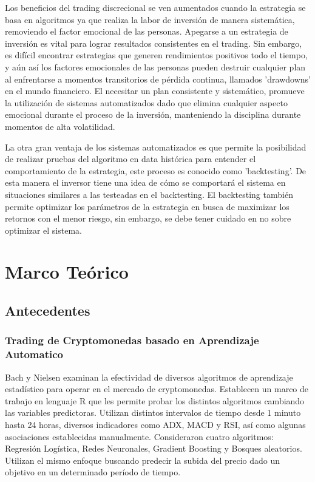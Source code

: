 \documentclass[a4paper,12pt]{Latex/Classes/PhDthesisPSnPDF}
\begin{document}
Los beneficios del trading discrecional se ven aumentados cuando la estrategia se basa en algoritmos ya que realiza la labor de inversión de manera sistemática, removiendo el factor emocional de las personas. Apegarse a un estrategia de inversión es vital para lograr resultados consistentes en el trading. Sin embargo, es difícil encontrar estrategias que generen rendimientos positivos todo el tiempo, y aún así los factores emocionales de las personas pueden destruir cualquier plan al enfrentarse a momentos transitorios de pérdida continua, llamados 'drawdowns' en el mundo financiero. El necesitar un plan consistente y sistemático, promueve la utilización de sistemas automatizados dado que elimina cualquier aspecto emocional durante el proceso de la inversión, manteniendo la disciplina durante momentos de alta volatilidad.

La otra gran ventaja de los sistemas automatizados es que permite la posibilidad de realizar pruebas del algoritmo en data histórica para entender el comportamiento de la estrategia, este proceso es conocido como 'backtesting'. De esta manera el inversor tiene una idea de cómo se comportará el sistema en situaciones similares a las testeadas en el backtesting. El backtesting también permite optimizar los parámetros de la estrategia en busca de maximizar los retornos con el menor riesgo, sin embargo, se debe tener cuidado en no sobre optimizar el sistema. 

\chapter{Marco Teórico}

\section{Antecedentes}

\subsection{Trading de Cryptomonedas basado en Aprendizaje Automatico}

Bach y Nielsen examinan la efectividad de diversos algoritmos de aprendizaje estadístico para operar en el mercado de cryptomonedas. Establecen un marco de trabajo en lenguaje R que les permite probar los distintos algoritmos cambiando las variables predictoras. Utilizan distintos intervalos de tiempo desde 1 minuto hasta 24 horas, diversos indicadores como ADX, MACD y RSI, así como algunas asociaciones establecidas manualmente. Consideraron cuatro algoritmos: Regresión Logística, Redes Neuronales, Gradient Boosting y Bosques aleatorios. Utilizan el mismo enfoque buscando predecir la subida del precio dado un objetivo en un determinado período de tiempo.
\end{document}
